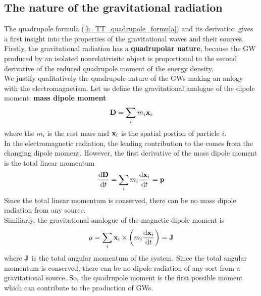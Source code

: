\subsection{The nature of the gravitational radiation}
The quadrupole formula (\ref{h_TT_quadrupole_formula}) and its derivation gives a  first insight into the properties of the gravitational waves and their sources.\\
Firstly, the gravitational radiation has a \textbf{quadrupolar nature}, because the GW produced by an isolated nonrelativisitc object is proportional to the second derivative of the reduced quadrupole moment of the energy density. \\
We justify qualitatively
the quadrupole nature of the GWs making an anlogy with the electromagnetism.
Let us define the gravitational analogue of the dipole moment: \textbf{mass dipole moment}
\begin{equation}
\label{mass_dipole_moment}
\vb{D} = \sum _{i} m_{i} \vb{x}_i
\end{equation}
where the $m_i$ is the rest mass and $\vb{x}_{i}$ is the spatial postion of particle $i$.\\
In the electromagnetic radiation, the leading contribution to the  comes from the changing dipole moment. 
However, the first derivative of the mass dipole moment is the total linear momentum
\[
\dv{\vb{D}}{t} = \sum _{i} m_i \dv{\vb{x}_i}{t} = \vb{p}
\]
Since the total linear momentum is conserved, there can be no mass dipole radiation from any source.\\
Similiarly, the gravitational analogue of the magnetic dipole moment is 
\[
\vb{\mu} = \sum_{i} \vb{x}_i \times \qty(m_i \dv{\vb{x}_i}{t}) =\vb{J}
\]
where $\vb{J}$ is the total angular momentum of the system. 
Since the total angular momentum is conserved, there can be no dipole radiation of any sort from a gravitational source.
So, the quadrupole moment is the first possible moment which can contribute to the production of GWs.\\

